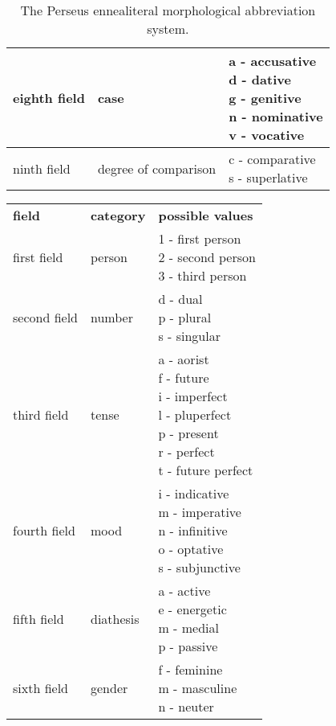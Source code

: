 \begin{table}
\begin{tabular}{|l|l|l|}
    eighth field & case & \specialcell{a - accusative\\d - dative\\g - genitive\\n - nominative\\v - vocative} \\ \hline
    ninth field & degree of comparison & \specialcell{c - comparative\\s - superlative} \\ \hline
    \hline
  \end{tabular}
  \caption{The Perseus ennealiteral morphological abbreviation system.} \label{table:perseusmorph}
\end{table}

\begin{table}
  \begin{tabular}{|l|l|l|}
    \hline
    \textbf{field}            & \textbf{category} & \textbf{possible values} \\ \thickhline
    first field & person & \specialcell{1 - first person\\2 - second person\\3 - third person} \\ \hline
    second field  & number & \specialcell{d - dual\\p - plural\\s - singular} \\ \hline
    third field & tense & \specialcell{a - aorist\\f - future\\i - imperfect\\l - pluperfect\\p - present\\r - perfect\\t - future perfect} \\ \hline
    fourth field & mood & \specialcell{i - indicative\\m - imperative\\n - infinitive\\o - optative\\s - subjunctive} \\ \hline
    fifth field & diathesis & \specialcell{a - active\\e - energetic\\m - medial\\p - passive} \\ \hline
    sixth field & gender & \specialcell{f - feminine\\m - masculine\\n - neuter} \\ \hline

\end{tabular}
\end{table}
